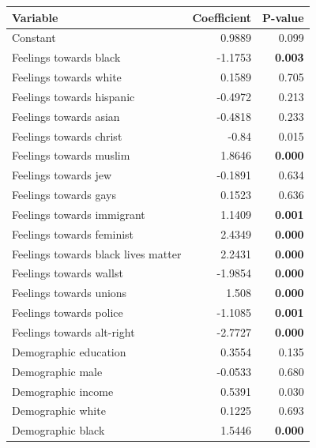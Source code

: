 \documentclass[a0,portrait]{a0poster}
\begin{document}
\begin{multicols}{2}
\begin{center}
  {\renewcommand{\arraystretch}{1.1}
\begin{tabular}{|l|r|r|} \hline
\textbf{Variable} & \textbf{Coefficient} & \textbf{P-value} \\ \hline \hline
Constant & 0.9889 & 0.099 \\ \hline
{\color{DarkMagenta}Feelings towards black} & -1.1753 & \textbf{0.003} \\ \hline
{\color{DarkMagenta}Feelings towards white} & 0.1589 & 0.705 \\ \hline
{\color{DarkMagenta}Feelings towards hispanic} & -0.4972 & 0.213 \\ \hline
{\color{DarkMagenta}Feelings towards asian} & -0.4818 & 0.233 \\ \hline
{\color{DarkMagenta}Feelings towards christ} & -0.84 & 0.015 \\ \hline
{\color{DarkMagenta}Feelings towards muslim} & 1.8646 & \textbf{0.000} \\ \hline
{\color{DarkMagenta}Feelings towards jew} & -0.1891 & 0.634 \\ \hline
{\color{CornflowerBlue}Feelings towards gays} & 0.1523 & 0.636 \\ \hline
{\color{CornflowerBlue}Feelings towards immigrant} & 1.1409 & \textbf{0.001} \\ \hline
{\color{CornflowerBlue}Feelings towards feminist} & 2.4349 & \textbf{0.000} \\ \hline
{\color{CornflowerBlue}Feelings towards black lives matter} & 2.2431 & \textbf{0.000} \\ \hline
{\color{CornflowerBlue}Feelings towards wallst} & -1.9854 & \textbf{0.000} \\ \hline
{\color{CornflowerBlue}Feelings towards unions} & 1.508 & \textbf{0.000} \\ \hline
{\color{CornflowerBlue}Feelings towards police} & -1.1085 & \textbf{0.001} \\ \hline
{\color{CornflowerBlue}Feelings towards alt-right} & -2.7727 &  \textbf{0.000} \\ \hline
Demographic education & 0.3554 & 0.135 \\ \hline
Demographic male & -0.0533 & 0.680 \\ \hline
Demographic income & 0.5391 & 0.030 \\ \hline
Demographic white & 0.1225 & 0.693 \\ \hline
Demographic black & 1.5446 & \textbf{0.000} \\ \hline

\end{tabular}}
\end{center}
\end{multicols}
\end{document}
